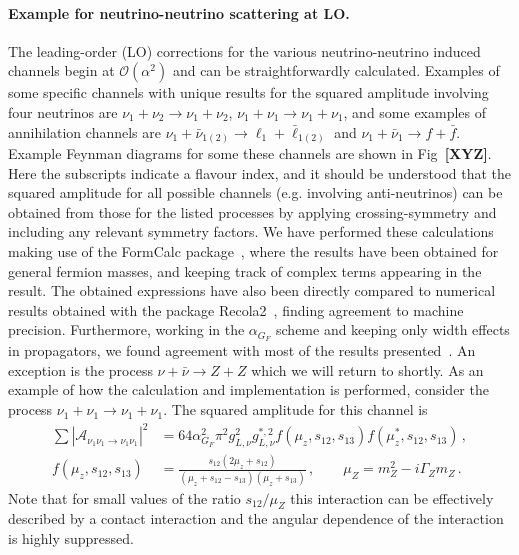 \documentclass[a4paper,11pt]{article}
\newcommand{\alert}[1]{{\bf \color{red}[{#1}]}}
\begin{document}
\paragraph{Example for neutrino-neutrino scattering at LO.} The leading-order (LO) corrections for the various neutrino-neutrino induced channels begin at $\mathcal{O}(\alpha^2)$ and can be straightforwardly calculated.
Examples of some specific channels with unique results for the squared amplitude involving four neutrinos are $\nu_1 + \nu_2 \to  \nu_1 + \nu_2$, $\nu_1 + \nu_1 \to  \nu_1 + \nu_1$, and some examples of annihilation channels are $\nu_1 + \bar \nu_{1(2)} \to \ell_1 + \bar \ell_{1(2)}$ and $\nu_1 + \bar \nu_1 \to f + \bar f$.
Example Feynman diagrams for some these channels are shown in Fig~\alert{XYZ}.
%
Here the subscripts indicate a flavour index, and it should be understood that the squared amplitude for all possible channels (e.g. involving anti-neutrinos) can be obtained from those for the listed processes by applying crossing-symmetry and including any relevant symmetry factors.
%
We have performed these calculations making use of the FormCalc package~\cite{Hahn:1998yk,Hahn:2016ebn}, where the results have been obtained for general fermion masses, and keeping track of complex terms appearing in the result.
%
The obtained expressions have also been directly compared to numerical results obtained with the package Recola2~\cite{Denner:2017wsf}, finding agreement to machine precision.
%
Furthermore, working in the $\alpha_{G_F}$ scheme and keeping only width effects in propagators, we found agreement with most of the results presented~\cite{Roulet:1992pz}. 
An exception is the process $\nu + \bar \nu \to Z + Z$ which we will return to shortly.
%
As an example of how the calculation and implementation is performed, consider the process $\nu_1 + \nu_1 \to \nu_1 + \nu_1$. 
The squared amplitude for this channel is
%
\begin{align}
\sum |\mathcal{A}_{\nu_1 \nu_1\to \nu_1 \nu_1}|^2 &= 
64 \alpha_{G_F}^2 \pi^2 g_{L,\nu}^2 g_{L,\nu}^{*,2} f(\mu_z,s_{12},s_{13}) f(\mu_z^*,s_{12},s_{13}) \,,\\
	f(\mu_z,s_{12},s_{13})  & = 
\frac{s_{12} \left( 2 \mu_z + s_{12}  \right) }{  \left( \mu_z + s_{12} - s_{13}  \right)  \left( \mu_z +  s_{13}  \right)  }\,,\qquad \mu_Z = m_Z^2 - i \Gamma_Z m_Z\,.
\end{align}
%
Note that for small values of the ratio $s_{12} / \mu_Z$ this interaction can be effectively described by a contact interaction and the angular dependence of the interaction is highly suppressed.
\end{document}
